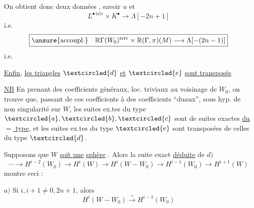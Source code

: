 On obtient donc deux données , savoir $u$ et
\[ L^{\bullet\,\mathrm{triv}}\times K^\bullet\longrightarrow\Lambda[-2n+1] \]
i.e.
\[\boxed{\text{\unsure{accoupl.}}\quad \mathbb R\Gamma(W_0)^{\mathrm{triv}}\times\mathbb R(\Gamma,\pi)(M)\longrightarrow\Lambda[-(2n-1)]}\]
i.e.

\uline{Enfin}, \uline{les triangles} $\textcircled{d}$ \uline{et} $\textcircled{e}$ \uline{sont transposés}

\uline{NB} En prenant des coefficients généraux, loc. triviaux au voisinage de \deleted{\unsure{\(\partial\)}} $W_0$, on trouve que, passant de ces coefficients à des coefficients ``duaux'',  sous hyp. de  non singularité sur $W$, les suites ex.tes du type $\textcircled{a},\textcircled{b},\textcircled{c}$ sont  de suites exactes \uline{du $=$ type}, et les suites ex.tes du type $\textcircled{e}$ sont transposées de celles du type $\textcircled{d}$.

Supposons que $W$ \uline{soit une} \uline{sphère} . Alors la suite exact  \uline{déduite} de $d)$
\[\cdots\longrightarrow H^{i-2}(W_0)\longrightarrow H^i(W)\longrightarrow H^i(W-W_0)\longrightarrow H^{i-1}(W_0)\longrightarrow H^{i+1}(W)\]
montre ceci :

$a)$ Si $i,i+1\ne0,2n+1$,   alors
\[H^i(W-W_0)\xrightarrow{\sim}H^{i-1}(W_0)\]
